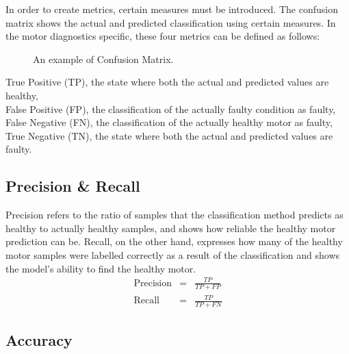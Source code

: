 In order to create metrics, certain measures must be introduced. The confusion matrix shows the actual and predicted classification using certain measures. In the motor diagnostics specific, these four metrics can be defined as follows:
\begin{figure}[h]
	\centering
	\vspace{1cm}
	\caption{An example of Confusion Matrix.}	
	\label{confusion}
\end{figure}

True Positive (TP), the state where both the actual and predicted values are healthy,\\
False Positive (FP), the classification of the actually faulty condition as faulty, \\
False Negative (FN), the classification of the actually healthy motor as faulty,\\
True Negative (TN), the state where both the actual and predicted values are faulty.
\subsection{Precision \& Recall}

Precision refers to the ratio of samples that the classification method predicts as healthy to actually healthy samples, and shows how reliable the healthy motor prediction can be. Recall, on the other hand, expresses how many of the healthy motor samples were labelled correctly as a result of the classification and shows the model's ability to find the healthy motor. 
\begin{eqnarray}
\text{Precision} &=& \displaystyle\frac{TP}{TP+FP}\\
\text{Recall} &=& \displaystyle\frac{TP}{TP+FN} 
\label{precision}
\end{eqnarray}
\subsection{Accuracy}

